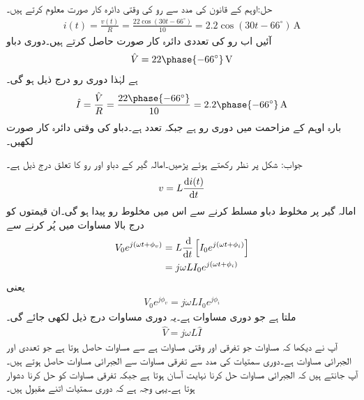 حل:اوہم کے قانون کی مدد سے رو کی وقتی دائرہ کار صورت معلوم کرتے ہیں۔
\begin{align*}
i(t)=\frac{v(t)}{R}=\frac{22\cos(30t-66^{\circ})}{10}=2.2\cos(30t-66^{\circ}) \, \si{\ampere}
\end{align*}
آئیں اب رو کی تعددی دائرہ کار صورت حاصل کرتے ہیں۔دوری دباو
\begin{align*}
\hat{V}=22\phase{-66^{\circ}}\, \si{\volt}
\end{align*}
ہے لہٰذا دوری رو درج ذیل ہو گی۔
\begin{align*}
\hat{I}=\frac{\hat{V}}{R}=\frac{22\phase{-66^{\circ}}}{10}=2.2\phase{-66^{\circ}} \, \si{\ampere}
\end{align*}
بارہ اوہم کے مزاحمت میں دوری رو  ہے جبکہ تعدد  ہے۔دباو کی وقتی دائرہ کار صورت لکھیں۔

جواب:
شکل  پر نظر رکھتے ہوئے پڑھیں۔امالہ گیر کے دباو اور رو کا تعلق درج ذیل ہے۔
\begin{align}\label{مساوات_بدلتا_امالہ_وقتی_تعلق}
v=L\frac{\dif i(t)}{\dif t}
\end{align}
امالہ گیر پر مخلوط دباو  مسلط کرنے سے اس میں مخلوط رو  پیدا ہو گی۔ان قیمتوں کو درج بالا مساوات میں پُر کرنے سے
\begin{align*}
V_0 e^{j(\omega t+\phi_v)}&=L \frac{\dif}{\dif t} \left[I_0 e^{j(\omega t +\phi_i)}\right]\\
&=j \omega L I_0 e^{j(\omega t+\phi_i)}
\end{align*}
یعنی
\begin{align*}
V_0 e^{j\phi_v}=j\omega L I_0 e^{j\phi_i}
\end{align*}
ملتا ہے جو دوری مساوات ہے۔یہ دوری مساوات درج ذیل لکھی جائے گی۔
\begin{align}\label{مساوات_بدلتا_امالہ_تعددی_تعلق_الف}
\hat{V}=j\omega L \hat{I}
\end{align} 
آپ نے دیکھا کہ مساوات  جو تفرقی اور وقتی مساوات ہے سے مساوات  حاصل ہوتا ہے جو تعددی اور الجبرائی مساوات ہے۔دوری سمتیات کی مدد سے تفرقی مساوات سے الجبرائی مساوات حاصل ہوتے ہیں۔آپ جانتے ہیں کہ الجبرائی مساوات حل کرنا نہایت آسان ہوتا ہے جبکہ تفرقی مساوات کو حل کرنا دشوار ہوتا ہے۔یہی وجہ ہے کہ دوری سمتیات اتنے مقبول ہیں۔

